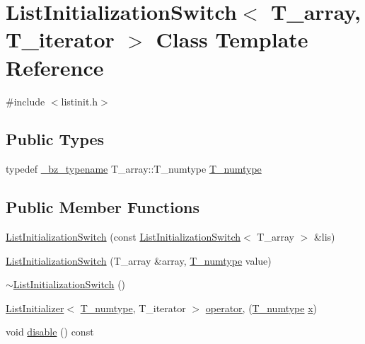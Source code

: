 \hypertarget{classListInitializationSwitch}{}\section{List\+Initialization\+Switch$<$ T\+\_\+array, T\+\_\+iterator $>$ Class Template Reference}
\label{classListInitializationSwitch}


{\ttfamily \#include $<$listinit.\+h$>$}

\subsection*{Public Types}
\begin{DoxyCompactItemize}
\item 
typedef \hyperlink{compiler_8h_a1bc40add3e72effc9cf69dbe445cbdfd}{\+\_\+bz\+\_\+typename} T\+\_\+array\+::\+T\+\_\+numtype \hyperlink{classListInitializationSwitch_ac93356c61fc683b281fe7eed00da55f4}{T\+\_\+numtype}
\end{DoxyCompactItemize}
\subsection*{Public Member Functions}
\begin{DoxyCompactItemize}
\item 
\hyperlink{classListInitializationSwitch_af9cdfb54296b9b65c48eed25190a4dbe}{List\+Initialization\+Switch} (const \hyperlink{classListInitializationSwitch}{List\+Initialization\+Switch}$<$ T\+\_\+array $>$ \&lis)
\item 
\hyperlink{classListInitializationSwitch_aa5cc44c2d4a4467ecaed44a785ff483b}{List\+Initialization\+Switch} (T\+\_\+array \&array, \hyperlink{classListInitializationSwitch_ac93356c61fc683b281fe7eed00da55f4}{T\+\_\+numtype} value)
\item 
\hyperlink{classListInitializationSwitch_aa009c6eef5a558d075df578f0b439fb0}{$\sim$\+List\+Initialization\+Switch} ()
\item 
\hyperlink{classListInitializer}{List\+Initializer}$<$ \hyperlink{classListInitializationSwitch_ac93356c61fc683b281fe7eed00da55f4}{T\+\_\+numtype}, T\+\_\+iterator $>$ \hyperlink{classListInitializationSwitch_a6b36c051c9959a418b00cb6853655ba0}{operator,} (\hyperlink{classListInitializationSwitch_ac93356c61fc683b281fe7eed00da55f4}{T\+\_\+numtype} \hyperlink{vecnorm1_8cc_ac73eed9e41ec09d58f112f06c2d6cb63}{x})
\item 
void \hyperlink{classListInitializationSwitch_a3a05fb2532600f69e6ded3ec6ff01da4}{disable} () const 
\end{DoxyCompactItemize}
